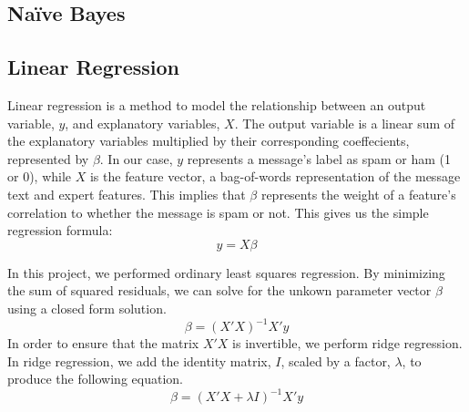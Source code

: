 \documentclass[preprint]{acm_proc_article-sp}
\begin{document}
\subsection{Na\"ive Bayes}

%
%



\subsection{Linear Regression}

Linear regression is a method to model the relationship between an output variable, 
$y$, and explanatory variables, $X$. The output variable is a linear sum of the explanatory 
variables multiplied by their corresponding coeffecients, represented by $\beta$. 
In our case, $y$ represents a message's label as spam or ham (1 or 0), 
while $X$ is the feature vector, a bag-of-words representation of the message text and expert features. 
This implies that $\beta$ represents the weight of a feature's correlation to whether 
the message is spam or not. This gives us the simple regression formula: $$y=X\beta$$

In this project, we performed ordinary least squares regression. By minimizing the sum of squared 
residuals, we can solve for the unkown parameter vector $\beta$ using a closed form solution. 
$$\beta=(X'X)^{-1}X'y$$ In order to ensure that the matrix $X'X$ is invertible, we perform ridge regression. 
In ridge regression, we add the identity matrix, $I$, scaled by a factor, $\lambda$, to 
produce the following equation. $$\beta=(X'X+\lambda I)^{-1}X'y$$
\end{document}
